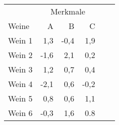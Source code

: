 \begin{tabular}{lrrrrr}
    \toprule
    & \multicolumn{3}{c}{Merkmale} \\
    \cmidrule(lr){2-4}
    Weine & A & B & C \\ 
    \midrule
    Wein 1  & 1,3 & -0,4 & 1,9 \\
    Wein 2 & -1,6 & 2,1 & 0,2 \\
    Wein 3 & 1,2 & 0,7 & 0,4 \\
    Wein 4 & -2,1 & 0,6 & -0,2 \\
    Wein 5 & 0,8 & 0,6 & 1,1 \\
    Wein 6 & -0,3 & 1,6 & 0.8 \\
    \bottomrule
\end{tabular}